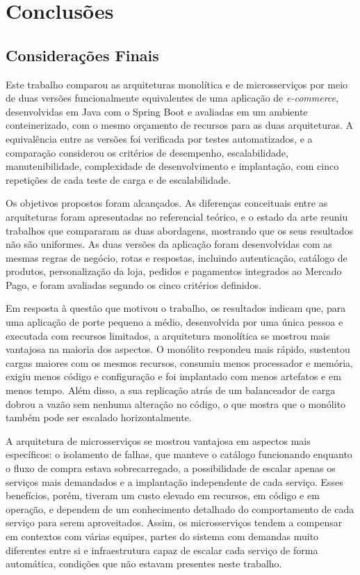 \chapter{Conclusões}
\label{cap:conclusoes}

\section{Considerações Finais}

Este trabalho comparou as arquiteturas monolítica e de microsserviços por meio de duas versões
funcionalmente equivalentes de uma aplicação de \textit{e-commerce}, desenvolvidas em Java com o
Spring Boot e avaliadas em um ambiente conteinerizado, com o mesmo orçamento de recursos para as
duas arquiteturas. A equivalência entre as versões foi verificada por testes automatizados, e a
comparação considerou os critérios de desempenho, escalabilidade, manutenibilidade,
complexidade de desenvolvimento e implantação, com cinco repetições de cada teste de carga e
de escalabilidade.

Os objetivos propostos foram alcançados. As diferenças conceituais entre as arquiteturas foram
apresentadas no referencial teórico, e o estado da arte reuniu trabalhos que compararam as
duas abordagens, mostrando que os seus resultados não são uniformes. As duas versões da
aplicação foram desenvolvidas com as mesmas regras de negócio, rotas e respostas, incluindo
autenticação, catálogo de produtos, personalização da loja, pedidos e pagamentos integrados ao
Mercado Pago, e foram avaliadas segundo os cinco critérios definidos.

Em resposta à questão que motivou o trabalho, os resultados indicam que, para uma aplicação de
porte pequeno a médio, desenvolvida por uma única pessoa e executada com recursos limitados, a
arquitetura monolítica se mostrou mais vantajosa na maioria dos aspectos. O monólito respondeu
mais rápido, sustentou cargas maiores com os mesmos recursos, consumiu menos processador e
memória, exigiu menos código e configuração e foi implantado com menos artefatos e em menos
tempo. Além disso, a sua replicação atrás de um balanceador de carga dobrou a vazão sem nenhuma
alteração no código, o que mostra que o monólito também pode ser escalado horizontalmente.

A arquitetura de microsserviços se mostrou vantajosa em aspectos mais específicos: o
isolamento de falhas, que manteve o catálogo funcionando enquanto o fluxo de compra estava
sobrecarregado, a possibilidade de escalar apenas os serviços mais demandados e a implantação
independente de cada serviço. Esses benefícios, porém, tiveram um custo elevado em recursos,
em código e em operação, e dependem de um conhecimento detalhado do comportamento de cada
serviço para serem aproveitados. Assim, os microsserviços tendem a compensar em contextos com
várias equipes, partes do sistema com demandas muito diferentes entre si e infraestrutura
capaz de escalar cada serviço de forma automática, condições que não estavam presentes neste
trabalho.

